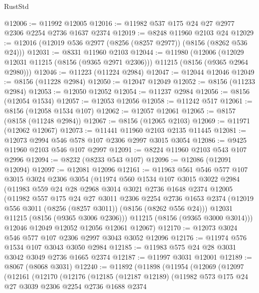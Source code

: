 \begin{lexlean}{RustStd}
\begin{coremodule}
@12006 := @11992 @12005
@12016 := @11982 @537 @175 @24 @27 @2977 @2306 @2254 @2736 @1637 @2374
@12019 := @8248 @11960 @2103 @24
@12029 := @12016 (@12019 @536 @2977 (@8256 (@8257 @2977)) (@8156 (@8262 @536 @24)))
@12031 := @8331 @11960 @2103
@12044 := @11980
    (@12006 (@12029 @12031 @11215 (@8156 (@9365 @2971 @2306))) @11215 (@8156 (@9365 @2964 @2980)))
@12046 := @11223 (@11224 @2984)
@12047 := @12044 @12046
@12049 := @8156 (@11228 @2984)
@12050 := @12047 @12049
@12052 := @8156 (@11233 @2984)
@12053 := @12050 @12052
@12054 := @11237 @2984
@12056 := @8156 (@12054 @1534)
@12057 := @12053 @12056
@12058 := @11242 @517
@12061 := @8156 (@12058 @1534 @107)
@12062 := @12057 @12061
@12065 := @8157 (@8158 (@11248 @2984))
@12067 := @8156 (@12065 @2103)
@12069 := @11971 (@12062 @12067)
@12073 := @11441 @11960 @2103 @2135 @11445
@12081 := @12073 @2994 @546 @578 @107 @2306 @2997 @3015 @3054
@12086 := @9425 @11960 @2103 @546 @107 @2997
@12091 := @8224 @11960 @2103 @543 @107 @2996
@12094 := @8232 (@8233 @543 @107)
@12096 := @12086 (@12091 @12094)
@12097 := @12081 @12096
@12161 := @11963
    @561
    @546
    @577
    @107
    @3015
    @3024
    @2306
    @3054
    (@11974
      @560
      @1534
      @107
      @3015
      @3022
      @2984
      (@11983
        @559
        @24
        @28
        @2968
        @3014
        @3021
        @2736
        @1648
        @2374
        @12005
        (@11982
          @557
          @175
          @24
          @27
          @3011
          @2306
          @2254
          @2736
          @1653
          @2374
          (@12019 @556 @3011 (@8256 (@8257 @3011)) (@8156 (@8262 @556 @24)))
          @12031
          @11215
          (@8156 (@9365 @3006 @2306)))
        @11215
        (@8156 (@9365 @3000 @3014)))
      @12046
      @12049
      @12052
      @12056
      @12061
      @12067)
@12170 := @12073 @3024 @546 @577 @107 @2306 @2997 @3043 @3052 @12096
@12176 := @11974 @576 @1534 @107 @3043 @3050 @2984
@12185 := @11983 @575 @24 @28 @3031 @3042 @3049 @2736 @1665 @2374
@12187 := @11997 @3031 @12001
@12189 := @8067 (@8068 @3031)
@12240 := @11892
    (@11898
      (@11954
        (@12069
          (@12097
            (@12161
              (@12170
                (@12176
                  (@12185
                    (@12187 @12189)
                    (@11982
                      @573
                      @175
                      @24
                      @27
                      @3039
                      @2306
                      @2254
                      @2736
                      @1688
                      @2374

\end{coremodule}
\end{lexlean}
